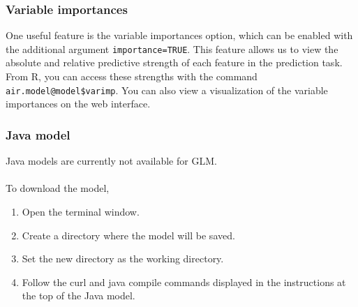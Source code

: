 \documentclass[11pt]{article}
\begin{document}
\subsubsection{Variable importances} \label{3.3.1}
One useful feature is the variable importances option, which can be enabled with the additional argument \texttt{importance=TRUE}. This feature allows us to view the absolute and relative predictive strength of each feature in the prediction task. From R, you can access these strengths with the command \texttt{air.model@model\$varimp}. You can also view a visualization of the variable
importances on the web interface.
\subsubsection{Java model} 
Java models are currently not available for GLM.
\\
\\

To download the model, 
\begin{enumerate}
\item Open the terminal window. 
\item Create a directory where the model will be saved.
\item Set the new directory as the working directory.
\item Follow the curl and java compile commands displayed in the instructions at the top of the Java model.
\end{enumerate}
\end{document}
